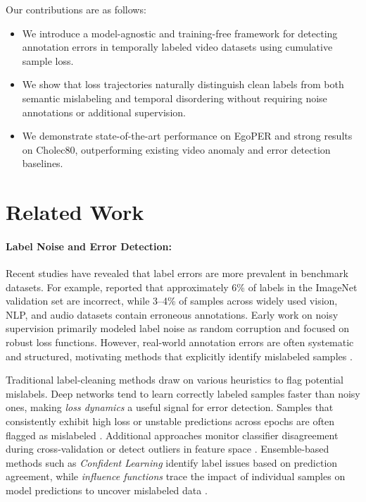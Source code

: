 \documentclass{article}
\theoremstyle{plain}
\theoremstyle{definition}
\theoremstyle{remark}
\begin{document}
Our contributions are as follows:
\vspace{-1em}
\begin{itemize} [leftmargin=*]
    \item We introduce a model-agnostic and training-free framework for detecting annotation errors in temporally labeled video datasets using cumulative sample loss.
    
    \vspace{-2mm}
    \item We show that loss trajectories naturally distinguish clean labels from both semantic mislabeling and temporal disordering without requiring noise annotations or additional supervision.

    \vspace{-2mm}
    \item We demonstrate state-of-the-art performance on EgoPER and strong results on Cholec80, outperforming existing video anomaly and error detection baselines.
\end{itemize}

\vspace{-1em}
\section{Related Work}
\vspace{-0.2em}
\paragraph{Label Noise and Error Detection:}
Recent studies have revealed that label errors are more prevalent in benchmark datasets. For example, \cite{athalye} reported that approximately 6\% of labels in the ImageNet validation set are incorrect, while 3--4\% of samples across widely used vision, NLP, and audio datasets contain erroneous annotations. Early work on noisy supervision primarily modeled label noise as random corruption and focused on robust loss functions. However, real-world annotation errors are often systematic and structured, motivating methods that explicitly identify mislabeled samples \cite{label_errors_learning_1}.

Traditional label-cleaning methods draw on various heuristics to flag potential mislabels. Deep networks tend to learn correctly labeled samples faster than noisy ones, making \textit{loss dynamics} a useful signal for error detection. Samples that consistently exhibit high loss or unstable predictions across epochs are often flagged as mislabeled \cite{label_errors_learning_2}. Additional approaches monitor classifier disagreement during cross-validation or detect outliers in feature space \cite{chen2019understanding}. Ensemble-based methods such as \textit{Confident Learning} \cite{northcutt} identify label issues based on prediction agreement, while \textit{influence functions} trace the impact of individual samples on model predictions to uncover mislabeled data \cite{label_errors_learning_3}.
\end{document}
